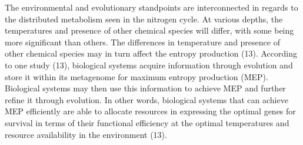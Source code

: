 \documentclass[11 pt,]{article}
\begin{document}
The environmental and evolutionary standpoints are interconnected in
regards to the distributed metabolism seen in the nitrogen cycle. At
various depths, the temperatures and presence of other chemical species
will differ, with some being more significant than others. The
differences in temperature and presence of other chemical species may in
turn affect the entropy production (13). According to one study (13),
biological systems acquire information through evolution and store it
within its metagenome for maximum entropy production (MEP). Biological
systems may then use this information to achieve MEP and further refine
it through evolution. In other words, biological systems that can
achieve MEP efficiently are able to allocate resources in expressing the
optimal genes for survival in terms of their functional efficiency at
the optimal temperatures and resource availability in the environment
(13).
\end{document}
